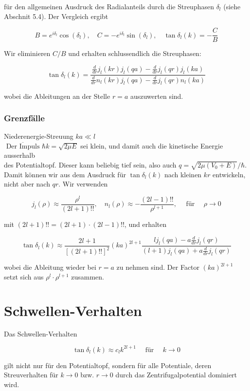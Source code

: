 \documentclass[10pt, letterpaper]{article}
\begin{document}
für den allgemeinen Ausdruck des Radialanteils durch die Streuphasen $\delta_{l}$ (siehe Abschnit 5.4). Der Vergleich ergibt

$$
B=e^{i \delta_{l}} \cos \left(\delta_{l}\right), \quad C=-e^{i \delta_{l}} \sin \left(\delta_{l}\right), \quad \tan \delta_{l}(k)=-\frac{C}{B}
$$

Wir eliminieren $C / B$ und erhalten schlussendlich die Streuphasen:

$$
\tan \delta_{l}(k)=\frac{\frac{d}{d r} j_{l}(k r) j_{l}(q a)-\frac{d}{d r} j_{l}(q r) j_{l}(k a)}{\frac{d}{d r} n_{l}(k r) j_{l}(q a)-\frac{d}{d r} j_{l}(q r) n_{l}(k a)}
$$

wobei die Ableitungen an der Stelle $r=a$ auszuwerten sind.

\subsubsection*{Grenzfälle}
Niederenergie-Streuung $k a \ll l$\\
$\overline{\text { Der Impuls }} \hbar k=\sqrt{2 \mu E}$ sei klein, und damit auch die kinetische Energie ausserhalb\\
des Potentialtopf. Dieser kann beliebig tief sein, also auch $q=\sqrt{2 \mu\left(V_{0}+E\right)} / \hbar$. Damit können wir aus dem Ausdruck für $\tan \delta_{l}(k)$ nach kleinen $k r$ entwickeln, nicht aber nach $q r$. Wir verwenden

$$
j_{l}(\rho) \approx \frac{\rho^{l}}{(2 l+1)!!}, \quad n_{l}(\rho) \approx-\frac{(2 l-1)!!}{\rho^{l+1}}, \quad \text { für } \quad \rho \rightarrow 0
$$

mit $(2 l+1)!!=(2 l+1) \cdot(2 l-1)!!$, und erhalten

$$
\tan \delta_{l}(k) \approx \frac{2 l+1}{[(2 l+1)!!]^{2}}(k a)^{2 l+1} \frac{l j_{l}(q a)-a \frac{d}{d r} j_{l}(q r)}{(l+1) j_{l}(q a)+a \frac{d}{d r} j_{l}(q r)}
$$

wobei die Ableitung wieder bei $r=a$ zu nehmen sind. Der Factor $(k a)^{2 l+1}$ setzt sich aus $\rho^{l} \cdot \rho^{l+1}$ zusammen.

\section*{Schwellen-Verhalten}
Das Schwellen-Verhalten

$$
\tan \delta_{l}(k) \approx c_{l} k^{2 l+1} \quad \text { für } \quad k \rightarrow 0
$$

gilt nicht nur für den Potentialtopf, sondern für alle Potentiale, deren Streuverhalten für $k \rightarrow 0$ bzw. $r \rightarrow 0$ durch das Zentrifugalpotential dominiert wird.
\end{document}
